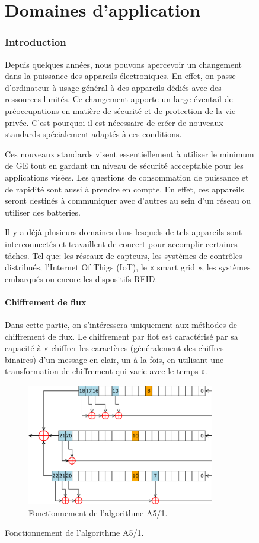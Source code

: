 \begin{figure}[!h]
\part{Domaines d'application}

	\section{Introduction}


	Depuis quelques années, nous pouvons apercevoir un changement dans la
	puissance des appareils électroniques. En effet, on passe d'ordinateur à usage
	général à des appareils dédiés avec des ressources limités. Ce changement
	apporte un large éventail de préoccupations en matière de sécurité et de
	protection de la vie privée. C'est pourquoi il est nécessaire de créer de
	nouveaux standards spécialement adaptés à ces conditions.

	Ces nouveaux standards visent essentiellement à utiliser le minimum de GE tout
	en gardant un niveau de sécurité accceptable pour les applications visées. Les
	questions de consommation de puissance et de rapidité sont aussi à prendre en
	compte. En effet, ces appareils seront destinés à communiquer avec d'autres au
	sein d'un réseau ou utiliser des batteries.

	Il y a déjà plusieurs domaines dans lesquels de tels appareils sont
	interconnectés et travaillent de concert pour accomplir certaines tâches.
	Tel que: les réseaux de capteurs, les systèmes de contrôles
	distribués, l'Internet Of Thigs (IoT), le « smart grid », les systèmes
	embarqués ou encore les dispositifs RFID.

	\subsection{Chiffrement de flux}

	Dans cette partie, on s'intéressera uniquement aux méthodes de chiffrement
	de flux. Le chiffrement par flot est caractérisé par sa capacité à « chiffrer
	les caractères (généralement des chiffres binaires) d'un message en clair, un à
	la fois, en utilisant une transformation de chiffrement qui varie avec le
	temps »\cite{appliedCrypto}.

	\begin{figure}[!h]
		\centering
		\includegraphics[width=0.9\textwidth]{imgs/application/A5.png}
		\caption{Fonctionnement de l'algorithme A5/1.}
		\label{algoA5}
	\end{figure}


\end{figure}
